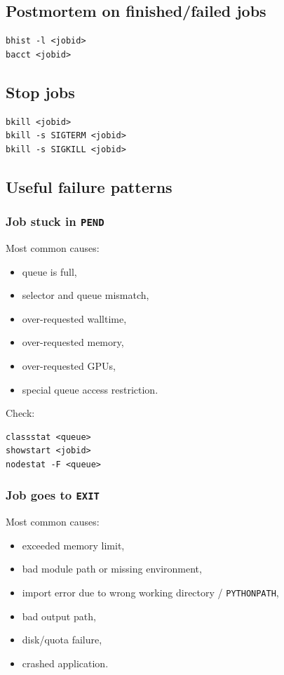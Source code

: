 \documentclass[11pt,a4paper]{article}
\begin{document}
\subsection{Postmortem on finished/failed jobs}

\begin{lstlisting}[style=shell]
bhist -l <jobid>
bacct <jobid>
\end{lstlisting}

\subsection{Stop jobs}

\begin{lstlisting}[style=shell]
bkill <jobid>
bkill -s SIGTERM <jobid>
bkill -s SIGKILL <jobid>
\end{lstlisting}

\subsection{Useful failure patterns}

\subsubsection{Job stuck in \texttt{PEND}}

Most common causes:
\begin{itemize}[leftmargin=1.5em]
  \item queue is full,
  \item selector and queue mismatch,
  \item over-requested walltime,
  \item over-requested memory,
  \item over-requested GPUs,
  \item special queue access restriction.
\end{itemize}

Check:
\begin{lstlisting}[style=shell]
classstat <queue>
showstart <jobid>
nodestat -F <queue>
\end{lstlisting}

\subsubsection{Job goes to \texttt{EXIT}}

Most common causes:
\begin{itemize}[leftmargin=1.5em]
  \item exceeded memory limit,
  \item bad module path or missing environment,
  \item import error due to wrong working directory / \texttt{PYTHONPATH},
  \item bad output path,
  \item disk/quota failure,
  \item crashed application.
\end{itemize}
\end{document}
